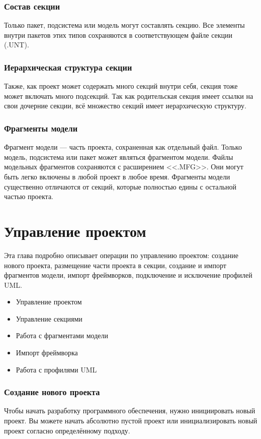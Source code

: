 \documentclass[a4paper,12pt]{report}
\begin{document}
\subsection*{Состав секции}
Только пакет, подсистема или модель могут составлять секцию. Все элементы внутри пакетов
этих типов сохраняются в соответствующем файле секции (.UNT).
\subsection*{Иерархическая структура секции}
Также, как проект может содержать много секций внутри себя, секция тоже может включать
много подсекций. Так как родительская секция имеет ссылки на свои дочерние секции, всё
множество секций имеет иерархическую структуру.
\subsection*{Фрагменты модели}
Фрагмент модели --- часть проекта, сохраненная как отдельный файл. Только модель, подсистема
или пакет может являться фрагментом модели. Файлы модельных фрагментов сохраняются с
расширением <<.MFG>>. Они могут быть легко включены в любой проект в любое время. Фрагменты
модели существенно отличаются от секций, которые полностью едины с остальной частью
проекта.

\chapter{Управление проектом}
Эта глава подробно описывает операции по управлению проектом: создание нового проекта,
размещение части проекта в секции, создание и импорт фрагментов модели, импорт фреймворков,
подключение и исключение профилей UML.
\begin{itemize}
	\item Управление проектом
	\item Управление секциями
	\item Работа с фрагментами модели
	\item Импорт фреймворка
	\item Работа с профилями UML
\end{itemize}

\subsection*{Создание нового проекта}
Чтобы начать разработку программного обеспечения, нужно инициировать новый проект. Вы
можете начать абсолютно пустой проект или инициализировать новый проект согласно
определённому подходу.
\end{document}
